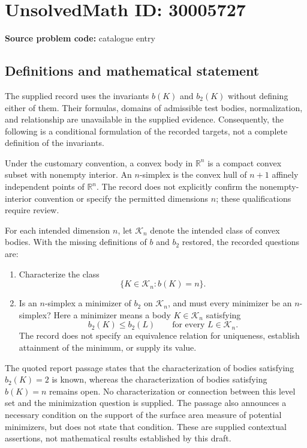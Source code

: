 \documentclass[11pt]{article}
\newcommand{\R}{\mathbb{R}}
\begin{document}
\section*{UnsolvedMath ID: 30005727}
\textbf{Source problem code:} catalogue entry
\subsection{Definitions and mathematical statement}
The supplied record uses the invariants \(b(K)\) and \(b_2(K)\) without defining either of them. Their formulas, domains of admissible test bodies, normalization, and relationship are unavailable in the supplied evidence. Consequently, the following is a conditional formulation of the recorded targets, not a complete definition of the invariants.

Under the customary convention, a convex body in \(\R^n\) is a compact convex subset with nonempty interior. An \(n\)-simplex is the convex hull of \(n+1\) affinely independent points of \(\R^n\). The record does not explicitly confirm the nonempty-interior convention or specify the permitted dimensions \(n\); these qualifications require review.

For each intended dimension \(n\), let \(\mathcal K_n\) denote the intended class of convex bodies. With the missing definitions of \(b\) and \(b_2\) restored, the recorded questions are:
\begin{enumerate}
\item Characterize the class
\[
\{K\in\mathcal K_n:b(K)=n\}.
\]
\item Is an \(n\)-simplex a minimizer of \(b_2\) on \(\mathcal K_n\), and must every minimizer be an \(n\)-simplex? Here a minimizer means a body \(K\in\mathcal K_n\) satisfying
\[
 b_2(K)\leq b_2(L)\qquad\text{for every }L\in\mathcal K_n.
\]
The record does not specify an equivalence relation for uniqueness, establish attainment of the minimum, or supply its value.
\end{enumerate}

The quoted report passage states that the characterization of bodies satisfying \(b_2(K)=2\) is known, whereas the characterization of bodies satisfying \(b(K)=n\) remains open. No characterization or connection between this level set and the minimization question is supplied. The passage also announces a necessary condition on the support of the surface area measure of potential minimizers, but does not state that condition. These are supplied contextual assertions, not mathematical results established by this draft.
\end{document}

